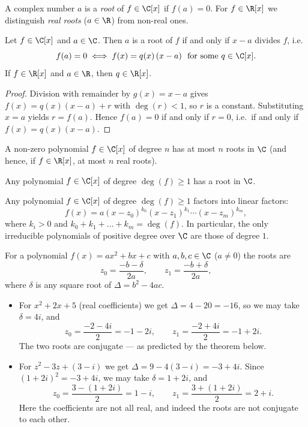 A complex number $a$ is a \emph{root} of $f\in \C[x]$ if $f(a)=0$. For $f\in\R[x]$ we distinguish
\emph{real roots} ($a\in\R$) from non-real ones.

\begin{theorem}
Let $f\in\C[x]$ and $a\in\C$. Then $a$ is a root of $f$ if and only if $x-a$ divides $f$, i.e.\
\[
f(a) = 0 \iff f(x) = q(x)\,(x-a) \ \text{ for some } q\in\C[x].
\]
If $f\in\R[x]$ and $a\in\R$, then $q\in\R[x]$.
\end{theorem}

\begin{proof}
Division with remainder by $g(x)=x-a$ gives $f(x) = q(x)(x-a)+r$ with $\deg(r)<1$, so $r$ is a constant.
Substituting $x=a$ yields $r = f(a)$. Hence $f(a)=0$ if and only if $r = 0$, i.e.\ if and only if
$f(x)=q(x)(x-a)$.
\end{proof}

\begin{corollary}
A non-zero polynomial $f\in\C[x]$ of degree $n$ has at most $n$ roots in $\C$ (and hence, if $f\in\R[x]$,
at most $n$ real roots).
\end{corollary}

\begin{theorem}
Any polynomial $f\in \C[x]$ of degree $\deg(f)\geq 1$ has a root in $\C$.
\end{theorem}

\begin{corollary}
Any polynomial $f\in \C[x]$ of degree $\deg(f)\geq 1$ factors into linear factors:
\[
f(x) = a(x-z_0)^{k_0}(x-z_1)^{k_1}\cdots (x-z_m)^{k_m},
\]
where $k_i>0$ and $k_0+k_1+\ldots+k_m = \deg(f)$. In particular, the only irreducible polynomials of positive
degree over $\C$ are those of degree $1$.
\end{corollary}

\begin{theorem}
For a polynomial $f(x) = ax^2 + bx + c$ with $a,b,c\in \C$ ($a\neq 0$) the roots are
\[
z_0 = \frac{-b-\delta}{2a}, \qquad z_1 = \frac{-b+\delta}{2a},
\]
where $\delta$ is any square root of $\Delta = b^2-4ac$.
\end{theorem}

\begin{example}
\hfill
\begin{itemize}
\item For $x^2+2x+5$ (real coefficients) we get $\Delta = 4-20 = -16$, so we may take $\delta = 4i$, and
\[
z_0 = \frac{-2-4i}{2} = -1-2i, \qquad z_1 = \frac{-2+4i}{2} = -1+2i.
\]
The two roots are conjugate — as predicted by the theorem below.
\item For $z^2-3z+(3-i)$ we get $\Delta = 9-4(3-i) = -3+4i$. Since $(1+2i)^2 = -3+4i$, we may take
$\delta = 1+2i$, and
\[
z_0 = \frac{3-(1+2i)}{2} = 1-i, \qquad z_1 = \frac{3+(1+2i)}{2} = 2+i.
\]
Here the coefficients are not all real, and indeed the roots are not conjugate to each other.
\end{itemize}
\end{example}

